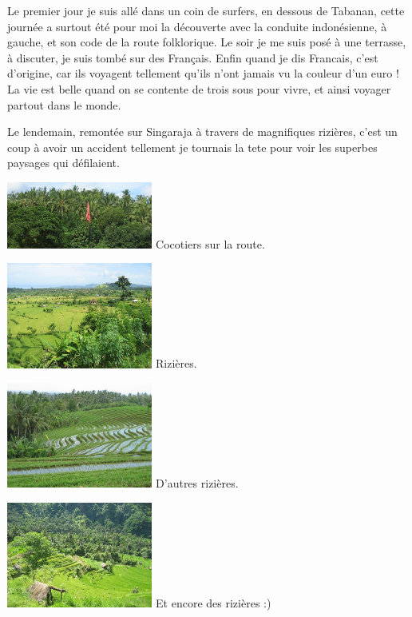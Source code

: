 \begin{multicols}{2}
Le premier jour je suis allé dans un coin de surfers, en dessous de Tabanan, cette journée a surtout été pour moi la découverte avec la conduite indonésienne, à gauche, et son code de la route folklorique. Le soir je me suis posé à une terrasse, à discuter, je suis tombé sur des Français. Enfin quand je dis Francais, c'est d'origine, car ils voyagent tellement qu'ils n'ont jamais vu la couleur d'un euro ! La vie est belle quand on se contente de trois sous pour vivre, et ainsi voyager partout dans le monde.

Le lendemain, remontée sur Singaraja à travers de magnifiques rizières, c'est un coup à avoir un accident tellement je tournais la tete pour voir les superbes paysages qui défilaient.

\hspace*{-0.65cm}
\includegraphics[width=4.8cm]{articles/Round-trip-in-bali/1208257309URc4.jpg}
Cocotiers sur la route.


\hspace*{-0.65cm}
\includegraphics[width=4.8cm]{articles/Round-trip-in-bali/1208257304SP22.jpg}
Rizières.


\hspace*{-0.65cm}
\includegraphics[width=4.8cm]{articles/Round-trip-in-bali/1208257308isJF.jpg}
D'autres rizières.


\hspace*{-0.65cm}
\includegraphics[width=4.8cm]{articles/Round-trip-in-bali/1208257307G9b6.jpg}
Et encore des rizières :)


\end{multicols}
